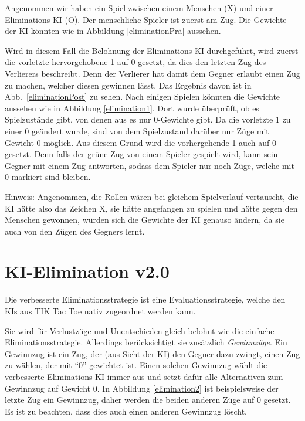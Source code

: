 \documentclass[titlepage]{scrartcl}
\newcommand{\TicTacToe}{TI\reflectbox K Tac Toe}
\begin{document}
Angenommen wir haben ein Spiel zwischen einem Menschen (X) und einer Eliminations-KI (O).
Der menschliche Spieler ist zuerst am Zug.
Die Gewichte der KI könnten wie in Abbildung \ref{eliminationPrä} aussehen.

Wird in diesem Fall die Belohnung der Eliminations-KI durchgeführt, wird zuerst die vorletzte hervorgehobene 1 auf 0 gesetzt, da dies den letzten Zug des Verlierers beschreibt.
Denn der Verlierer hat damit dem Gegner erlaubt einen Zug zu machen, welcher diesen gewinnen lässt.
Das Ergebnis davon ist in Abb.~\ref{eliminationPost} zu sehen.
Nach einigen Spielen könnten die Gewichte aussehen wie in Abbildung \ref{elimination1}.
Dort wurde überprüft, ob es Spielzustände gibt, von denen aus es nur 0-Gewichte gibt. Da die vorletzte 1 zu einer 0 geändert wurde, sind von dem Spielzustand darüber nur Züge mit Gewicht 0 möglich. Aus diesem Grund wird die vorhergehende 1 auch auf 0 gesetzt. Denn falls der grüne Zug von einem Spieler gespielt wird, kann sein Gegner mit einem Zug antworten, sodass dem Spieler nur noch Züge, welche mit 0 markiert sind bleiben.

Hinweis: Angenommen, die Rollen wären bei gleichem Spielverlauf vertauscht, die KI hätte also das Zeichen X, sie hätte angefangen zu spielen und hätte gegen den Menschen gewonnen, würden sich die Gewichte der KI genauso ändern, da sie auch von den Zügen des Gegners lernt.
\FloatBarrier
\newpage

\section{KI-Elimination v2.0}
Die verbesserte Eliminationsstrategie ist eine Evaluationsstrategie, welche den KIs aus \TicTacToe{} nativ zugeordnet werden kann.

Sie wird für Verlustzüge und Unentschieden gleich belohnt wie die einfache Eliminationsstrategie.
Allerdings berücksichtigt sie zusätzlich \emph{Gewinnzüge}.
Ein Gewinnzug ist ein Zug, der (aus Sicht der KI) den Gegner dazu zwingt, einen Zug zu wählen, der mit "`0"' gewichtet ist.
Einen solchen Gewinnzug wählt die verbesserte Eliminations-KI immer aus und setzt dafür alle Alternativen zum Gewinnzug auf Gewicht 0.
In Abbildung \ref{elimination2} ist beispielsweise der letzte Zug ein Gewinnzug, daher werden die beiden anderen Züge auf 0 gesetzt.
Es ist zu beachten, dass dies auch einen anderen Gewinnzug löscht.
\end{document}
